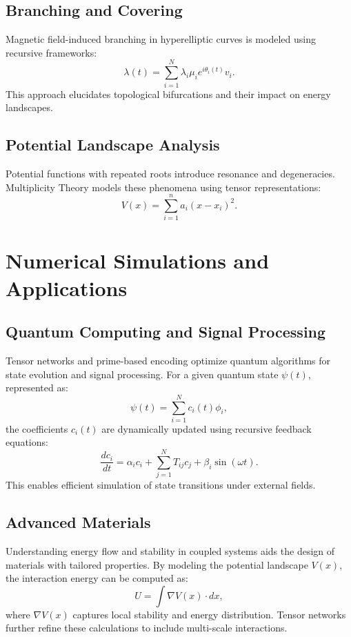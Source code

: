 \documentclass{article}
\theoremstyle{plain}
\begin{document}
\subsection{Branching and Covering}
Magnetic field-induced branching in hyperelliptic curves is modeled using recursive frameworks:\newline
\begin{equation}
\lambda(t) = \sum_{i=1}^N \lambda_i \mu_i e^{i\theta_i(t)} v_i.
\end{equation}
This approach elucidates topological bifurcations and their impact on energy landscapes.

\subsection{Potential Landscape Analysis}
Potential functions with repeated roots introduce resonance and degeneracies. Multiplicity Theory models these phenomena using tensor representations:
\begin{equation}
V(x) = \sum_{i=1}^n a_i (x - x_i)^2.
\end{equation}

\section{Numerical Simulations and Applications}

\subsection{Quantum Computing and Signal Processing}
Tensor networks and prime-based encoding optimize quantum algorithms for state evolution and signal processing. For a given quantum state $\psi(t)$, represented as:
\begin{equation}
\psi(t) = \sum_{i=1}^N c_i(t) \phi_i,
\end{equation}
the coefficients $c_i(t)$ are dynamically updated using recursive feedback equations:\newline
\begin{equation}
\frac{dc_i}{dt} = \alpha_i c_i + \sum_{j=1}^N T_{ij} c_j + \beta_i \sin(\omega t).
\end{equation}
This enables efficient simulation of state transitions under external fields.

\subsection{Advanced Materials}
Understanding energy flow and stability in coupled systems aids the design of materials with tailored properties. By modeling the potential landscape $V(x)$, the interaction energy can be computed as:
\begin{equation}
U = \int \nabla V(x) \cdot dx,
\end{equation}
where $\nabla V(x)$ captures local stability and energy distribution. Tensor networks further refine these calculations to include multi-scale interactions.
\end{document}

